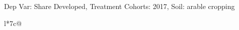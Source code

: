 \begin{table}[H]
\captionlistentry[table]{}
\label{table:beaver_land_class_DVis_land_class_3_SCg2_SSAC}
\scriptsize %
Dep Var: Share Developed, Treatment Cohorts: 2017, Soil: arable cropping \\
\begin{threeparttable}
\begin{tabulary}{\textwidth}{l*{7}{c}@{}}
\toprule \toprule
\noalign{\smallskip}
\noalign{\smallskip}
\midrule \bottomrule
\end{tabulary}
\medskip
\end{threeparttable}
\end{table}
